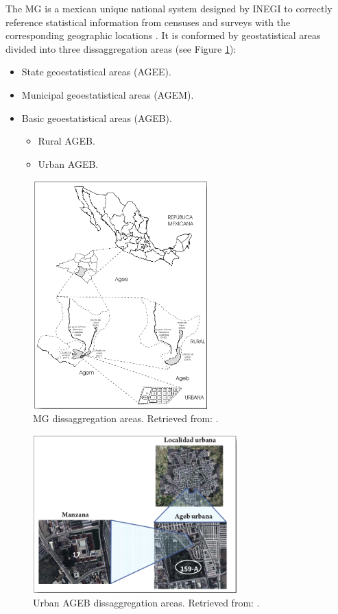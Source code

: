 The MG is a mexican unique national system designed by INEGI to correctly reference statistical information from censuses and surveys with the corresponding geographic locations \cite{manualMGN}. It is conformed by geostatistical areas divided into three dissaggregation areas (see Figure \ref{fig:MGN_divisions}):

\begin{itemize}
 \item State geoestatistical areas (AGEE).
 \item Municipal geoestatistical areas (AGEM).
 \item Basic geoestatistical areas (AGEB).
  \begin{itemize}
   \item Rural AGEB.
   \item Urban AGEB.
  \end{itemize}
\end{itemize}

\begin{figure}[htpb]
  \centering
  \includegraphics[width=0.6\textwidth]{Figures/MGN_divisions.png}
  \caption{MG dissaggregation areas. Retrieved from: \cite{manualMGN}.
    \label{fig:MGN_divisions}}
\end{figure}

\begin{figure}[htpb]
  \centering
  \includegraphics[width=0.7\textwidth]{Figures/ageb_division.png}
  \caption{Urban AGEB dissaggregation areas. Retrieved from: \cite{manualMGN}.
    \label{fig:ageb_division}}
\end{figure}

